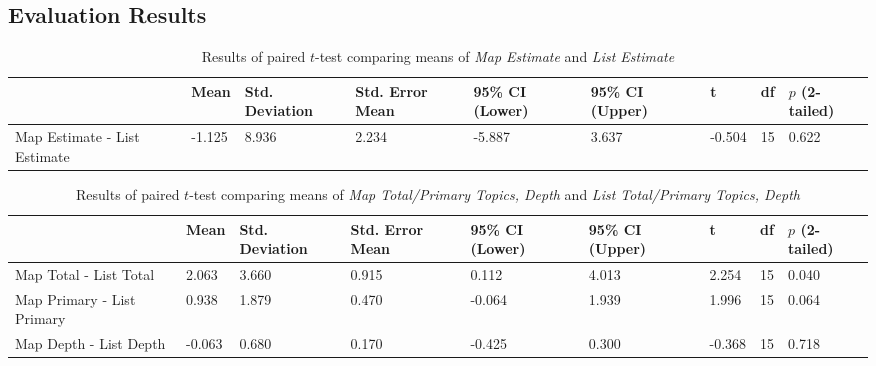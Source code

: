 \begin{landscape}
\section{Evaluation Results} \label{sec:evalresults}

\begin{table}[hbtp!]
\centering
\caption{Results of paired $t$-test comparing means of \textit{Map Estimate} and \textit{List Estimate}}\vspace{0.3cm}
\label{res:estimate}
\begin{tabular}{|m{3cm}|l|l|l|l|l|l|l|l|}
\hline
& Mean & Std. Deviation & Std. Error Mean & 95\% CI (Lower) & 95\% CI (Upper) & t & df & $p$ (2-tailed) \\ \hline\hline
Map Estimate - \newline List Estimate & -1.125 & 8.936          & 2.234           & -5.887                         & 3.637                         & -0.504 & 15 & 0.622           \\ \hline
\end{tabular}
\end{table}


\begin{table}[hbtp!]
\centering
\caption{Results of paired $t$-test comparing means of \textit{Map Total/Primary Topics, Depth} and \textit{List Total/Primary Topics, Depth}}\vspace{0.3cm}
\label{res:index}
\begin{tabular}{|m{3cm}|l|l|l|l|l|l|l|l|}
\hline
& Mean & Std. Deviation & Std. Error Mean & 95\% CI (Lower) & 95\% CI (Upper) & t & df & $p$ (2-tailed) \\ \hline\hline
Map Total - List Total & 2.063  & 3.660 & 0.915 & 0.112  & 4.013 & 2.254  & 15 & 0.040 \\ \hline
Map Primary - List Primary & 0.938  & 1.879 & 0.470 & -0.064 & 1.939 & 1.996  & 15 & 0.064 \\ \hline
Map Depth - List Depth & -0.063 & 0.680 & 0.170 & -0.425 & 0.300 & -0.368 & 15 & 0.718 \\ \hline
\end{tabular}
\end{table}



\end{landscape}
